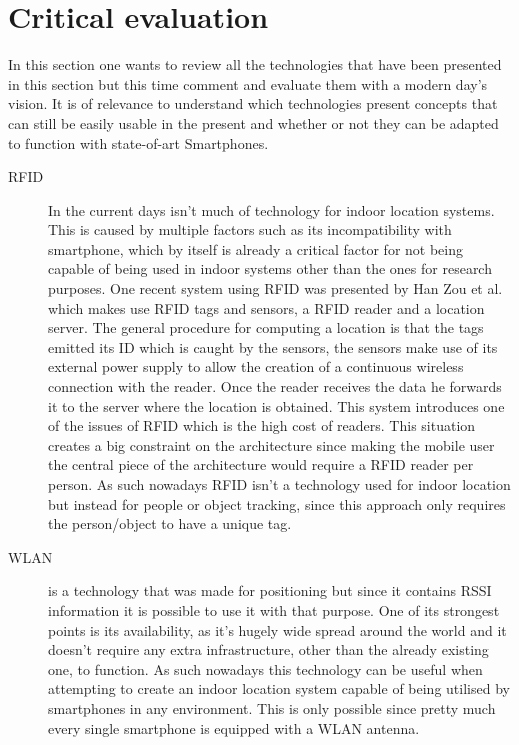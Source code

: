 \section{Critical evaluation}
\label{sec:critical}

In this section one wants to review all the technologies that have been presented in this section but this time comment and evaluate them with a modern day's vision. It is of relevance to understand which technologies present concepts that can still be easily usable in the present and whether or not they can be adapted to function with state-of-art Smartphones.

\begin{description}
\item [\acf{RFID}]  In the current days isn't much of technology for indoor location systems. This is caused by multiple factors such as its incompatibility with smartphone, which by itself is already a critical factor for not being capable of being used in indoor systems other than the ones for research purposes. One recent system using \ac{RFID} was presented by Han Zou et al. \cite{rfid_sys} which makes use RFID tags and sensors, a \ac{RFID} reader and a location server. The general procedure for computing a location is that the tags emitted its ID which is caught by the sensors, the sensors make use of its external power supply to allow the creation of a continuous wireless connection with the reader. Once the reader receives the data he forwards it to the server where the location is obtained. This system introduces one of the issues of RFID which is the high cost of readers. This situation creates a big constraint on the architecture since making the mobile user the central piece of the architecture would require a \ac{RFID} reader per person. As such nowadays \ac{RFID} isn't a technology used for indoor location but instead for people or object tracking, since this approach only requires the person/object to have a unique tag. 

\item[WLAN] is a technology that was made for positioning but since it contains \acf{RSSI} information it is possible to use it with that purpose. One of its strongest points is its availability, as it's hugely wide spread around the world and it doesn't require any extra infrastructure, other than the already existing one, to function. As such nowadays this technology can be useful when attempting to create an indoor location system capable of being utilised by smartphones in any environment. This is only possible since pretty much every single smartphone is equipped with a WLAN antenna.


\end{description}
